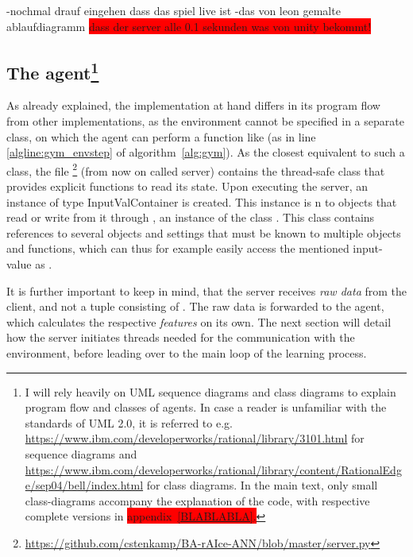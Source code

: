 -nochmal drauf eingehen dass das spiel live ist
-das von leon gemalte ablaufdiagramm
\colorbox{red}{dass der server alle 0.1 sekunden was von unity bekommt!}


\subsection{The agent\footnote{I will rely heavily on UML sequence diagrams and class diagrams to explain program flow and classes of agents. In case a reader is unfamiliar with the standards of UML 2.0, it is referred to e.g. \url{https://www.ibm.com/developerworks/rational/library/3101.html} for sequence diagrams and \url{https://www.ibm.com/developerworks/rational/library/content/RationalEdge/sep04/bell/index.html} for class diagrams. In the main text, only small class-diagrams accompany the explanation of the code, with respective complete versions in  \colorbox{red}{appendix~\ref{BLABLABLA}.}}}

As already explained, the implementation at hand differs in its program flow from other implementations, as the environment cannot be specified in a separate class, on which the agent can perform a function like  (as in line \ref{algline:gym_envstep} of algorithm~\ref{alg:gym}). As the closest equivalent to such a class, the file  \footnote{\url{https://github.com/cstenkamp/BA-rAIce-ANN/blob/master/server.py}} (from now on called server) contains the thread-safe class  that provides explicit functions to read its state. Upon executing the server, an instance  of type InputValContainer is created. This instance is n to objects that read or write from it through , an instance of the class . This class contains references to several objects and settings that must be known to multiple objects and functions, which can thus for example easily access the mentioned input-value as .

It is further important to keep in mind, that the server receives \textit{raw data} from the client, and not a tuple consisting of . The raw data is forwarded to the agent, which calculates the respective \textit{features} on its own. The next section will detail how the server initiates threads needed for the communication with the environment, before leading over to the main loop of the learning process.

